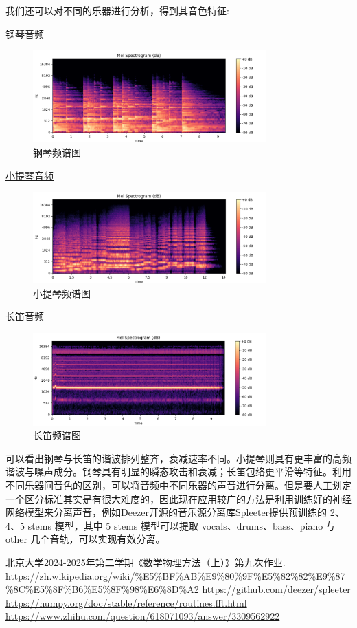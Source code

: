 \documentclass[11pt,a4paper]{ctexart}
\begin{document}
	我们还可以对不同的乐器进行分析，得到其音色特征:
	
	
	\href{run:钢琴.mp3}{钢琴音频}
	\begin{figure}[h]
		\centering
		\includegraphics[width=0.8\textwidth]{钢琴.png} %
		\caption{钢琴频谱图} %
	\end{figure}
	\FloatBarrier
		\href{run:小提琴.mp3}{小提琴音频}
	\begin{figure}[h]
		\centering
		\includegraphics[width=0.8\textwidth]{小提琴.png} %
		\caption{小提琴频谱图} %
	\end{figure}
	\FloatBarrier
		\href{run:长笛.mp3}{长笛音频}
	\begin{figure}[h]
		\centering
		\includegraphics[width=0.8\textwidth]{长笛.png} %
		\caption{长笛频谱图} %
	\end{figure}
	\FloatBarrier
	可以看出钢琴与长笛的谐波排列整齐，衰减速率不同。小提琴则具有更丰富的高频谐波与噪声成分。钢琴具有明显的瞬态攻击和衰减；长笛包络更平滑等特征。利用不同乐器间音色的区别，可以将音频中不同乐器的声音进行分离。但是要人工划定一个区分标准其实是有很大难度的，因此现在应用较广的方法是利用训练好的神经网络模型来分离声音，例如Deezer开源的音乐源分离库Spleeter提供预训练的 2、4、5 stems 模型，其中 5 stems 模型可以提取 vocals、drums、bass、piano 与 other 几个音轨，可以实现有效分离。
	\begin{thebibliography}{9}
		北京大学2024-2025年第二学期《数学物理方法（上）》第九次作业.
		\url{https://zh.wikipedia.org/wiki/\%E5\%BF\%AB\%E9\%80\%9F\%E5\%82\%82\%E9\%87\%8C\%E5\%8F\%B6\%E5\%8F\%98\%E6\%8D\%A2}
		\url{https://github.com/deezer/spleeter}
		\url{https://numpy.org/doc/stable/reference/routines.fft.html}
		\url{https://www.zhihu.com/question/618071093/answer/3309562922}
	\end{thebibliography}
\end{document}
